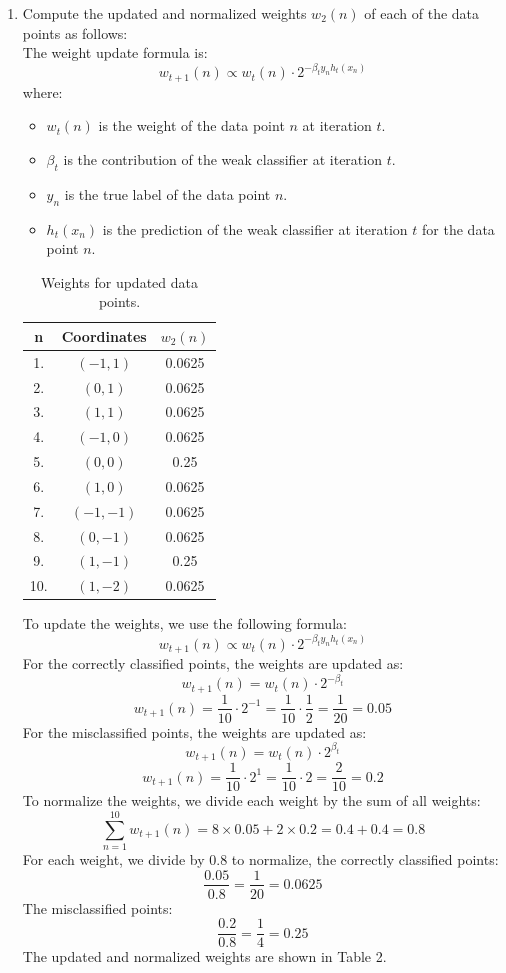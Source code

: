 \documentclass[a3paper,12pt]{extarticle} %
\begin{document}
\begin{enumerate}
\item  Compute the updated and normalized weights $w_2(n)$ of each of the data points as follows:
\\ The weight update formula is:
\[
w_{t+1}(n) \propto w_t(n) \cdot 2^{-\beta_t y_n h_t(x_n)}
\]
where:
\begin{itemize}
    \item $w_t(n)$ is the weight of the data point $n$ at iteration $t$.
    \item $\beta_t$ is the contribution of the weak classifier at iteration $t$.
    \item $y_n$ is the true label of the data point $n$.
    \item $h_t(x_n)$ is the prediction of the weak classifier at iteration $t$ for the data point $n$.
\end{itemize}
\begin{table}[h!]
    \centering
    \begin{tabular}{|c|c|c|}
    \hline
    \textbf{n} & \textbf{Coordinates} & \textbf{$w_2(n)$} \\ \hline
    1. & $(-1, 1)$ & 0.0625 \\ \hline
    2. & $(0, 1)$ & 0.0625\\ \hline
    3. & $(1, 1)$ & 0.0625\\ \hline
    4. & $(-1, 0)$ & 0.0625 \\ \hline
    5. & $(0, 0)$ & 0.25 \\ \hline
    6. & $(1, 0)$ & 0.0625 \\ \hline
    7. & $(-1, -1)$ & 0.0625 \\ \hline
    8. & $(0, -1)$ & 0.0625 \\ \hline
    9. & $(1, -1)$ & 0.25 \\ \hline
    10. & \((1, -2)\) & 0.0625 \\ \hline
    \end{tabular}
    \caption{Weights for updated data points.}
    \label{table:weights}
\end{table}
To update the weights, we use the following formula:
\[
w_{t+1}(n) \propto w_t(n) \cdot 2^{-\beta_t y_n h_t(x_n)}
\]
For the correctly classified points, the weights are updated as:
\[
w_{t+1}(n) = w_t(n) \cdot 2^{-\beta_t}
\]
\[
w_{t+1}(n) = \frac{1}{10} \cdot 2^{-1} = \frac{1}{10} \cdot \frac{1}{2} = \frac{1}{20} = 0.05
\]
For the misclassified points, the weights are updated as:
\[
w_{t+1}(n) = w_t(n) \cdot 2^{\beta_t}
\]
\[
w_{t+1}(n) = \frac{1}{10} \cdot 2^{1} = \frac{1}{10} \cdot 2 = \frac{2}{10} = 0.2
\]
To normalize the weights, we divide each weight by the sum of all weights:
\[
\sum_{n=1}^{10} w_{t+1}(n) = 8 \times 0.05 + 2 \times 0.2 = 0.4 + 0.4 = 0.8
\]
For each weight, we divide by 0.8 to normalize, the correctly classified points:
\[
\frac{0.05}{0.8} = \frac{1}{20} = 0.0625
\]
The misclassified points:
\[
\frac{0.2}{0.8} = \frac{1}{4} = 0.25
\]
The updated and normalized weights are shown in Table 2.



\end{enumerate}
\end{document}
